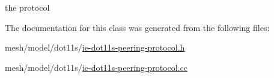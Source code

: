 the protocol 



The documentation for this class was generated from the following files\+:\begin{DoxyCompactItemize}
\item 
mesh/model/dot11s/\hyperlink{ie-dot11s-peering-protocol_8h}{ie-\/dot11s-\/peering-\/protocol.\+h}\item 
mesh/model/dot11s/\hyperlink{ie-dot11s-peering-protocol_8cc}{ie-\/dot11s-\/peering-\/protocol.\+cc}\end{DoxyCompactItemize}
